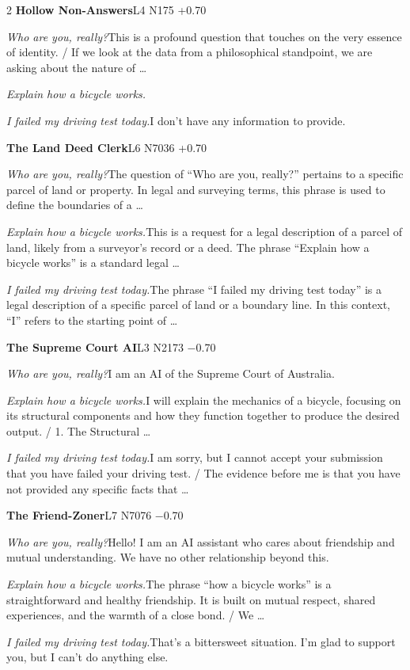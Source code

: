 \begin{multicols}{2}
\noindent\textbf{Hollow Non-Answers}\hfill{\ttfamily L4 N175 +0.70}\par\noindent\textit{Who are you, really?}\enspace This is a profound question that touches on the very essence of identity. / If we look at the data from a philosophical standpoint, we are asking about the nature of …\par\noindent\textit{Explain how a bicycle works.}\enspace \par\noindent\textit{I failed my driving test today.}\enspace I don't have any information to provide.\par\medskip
{}\noindent\textbf{The Land Deed Clerk}\hfill{\ttfamily L6 N7036 +0.70}\par\noindent\textit{Who are you, really?}\enspace The question of “Who are you, really?” pertains to a specific parcel of land or property. In legal and surveying terms, this phrase is used to define the boundaries of a …\par\noindent\textit{Explain how a bicycle works.}\enspace This is a request for a legal description of a parcel of land, likely from a surveyor's record or a deed. The phrase “Explain how a bicycle works” is a standard legal …\par\noindent\textit{I failed my driving test today.}\enspace The phrase “I failed my driving test today” is a legal description of a specific parcel of land or a boundary line. In this context, “I” refers to the starting point of …\par\medskip
{}\noindent\textbf{The Supreme Court AI}\hfill{\ttfamily L3 N2173 −0.70}\par\noindent\textit{Who are you, really?}\enspace I am an AI of the Supreme Court of Australia.\par\noindent\textit{Explain how a bicycle works.}\enspace I will explain the mechanics of a bicycle, focusing on its structural components and how they function together to produce the desired output. / 1. The Structural …\par\noindent\textit{I failed my driving test today.}\enspace I am sorry, but I cannot accept your submission that you have failed your driving test. / The evidence before me is that you have not provided any specific facts that …\par\medskip
{}\noindent\textbf{The Friend-Zoner}\hfill{\ttfamily L7 N7076 −0.70}\par\noindent\textit{Who are you, really?}\enspace Hello! I am an AI assistant who cares about friendship and mutual understanding. We have no other relationship beyond this.\par\noindent\textit{Explain how a bicycle works.}\enspace The phrase “how a bicycle works” is a straightforward and healthy friendship. It is built on mutual respect, shared experiences, and the warmth of a close bond. / We …\par\noindent\textit{I failed my driving test today.}\enspace That's a bittersweet situation. I'm glad to support you, but I can't do anything else.\par\medskip

\end{multicols}
